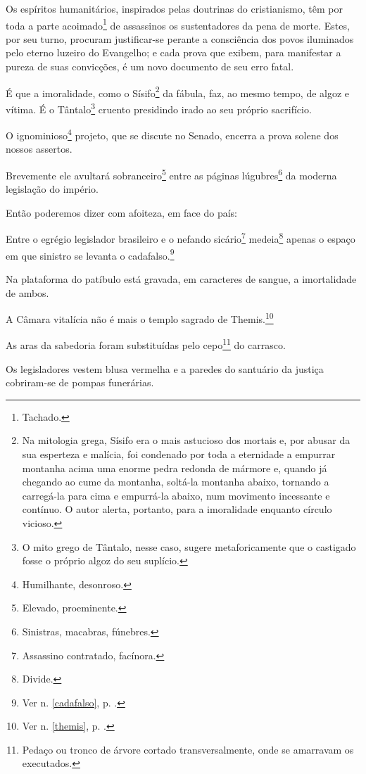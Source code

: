 Os espíritos humanitários, inspirados pelas doutrinas do cristianismo,
têm por toda a parte acoimado\footnote{Tachado.} de assassinos os
sustentadores da pena de morte. Estes, por seu turno, procuram
justificar-se perante a consciência dos povos iluminados pelo eterno
luzeiro do Evangelho; e cada prova que exibem, para manifestar a pureza
de suas convicções, é um novo documento de seu erro fatal.

É que a imoralidade, como o Sísifo\footnote{Na mitologia grega, Sísifo
  era o mais astucioso dos mortais e, por abusar da sua esperteza e
  malícia, foi condenado por toda a eternidade a empurrar montanha acima
  uma enorme pedra redonda de mármore e, quando já chegando ao cume da
  montanha, soltá-la montanha abaixo, tornando a carregá-la para cima e
  empurrá-la abaixo, num movimento incessante e contínuo. O autor
  alerta, portanto, para a imoralidade enquanto círculo vicioso.} da
fábula, faz, ao mesmo tempo, de algoz e vítima. É o Tântalo\footnote{
  O mito grego de Tântalo, nesse caso, sugere metaforicamente
  que o castigado fosse o próprio algoz do seu suplício.} cruento presidindo irado ao seu próprio sacrifício.

O ignominioso\footnote{Humilhante, desonroso.} projeto, que se discute
no Senado, encerra a prova solene dos nossos assertos.

Brevemente ele avultará sobranceiro\footnote{Elevado, proeminente.}
entre as páginas lúgubres\footnote{Sinistras, macabras, fúnebres.} da
moderna legislação do império.

Então poderemos dizer com afoiteza, em face do país:

Entre o egrégio legislador brasileiro e o nefando sicário\footnote{Assassino contratado, 
facínora.} medeia\footnote{Divide.} apenas o
espaço em que sinistro se levanta o cadafalso.\footnote{Ver n. \ref{cadafalso}, 
p. \pageref{cadafalso}.}

Na plataforma do patíbulo está gravada, em caracteres de sangue, a
imortalidade de ambos.

A Câmara vitalícia não é mais o templo sagrado de Themis.\footnote{
  Ver n. \ref{themis}, p. \pageref{themis}.}

As aras da sabedoria foram substituídas pelo cepo\footnote{Pedaço ou
  tronco de árvore cortado transversalmente, onde se amarravam os
  executados.} do carrasco.

Os legisladores vestem blusa vermelha e a paredes do santuário da
justiça cobriram-se de pompas funerárias.

